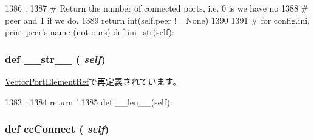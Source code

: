 \begin{DoxyCode}
1386                      :
1387         # Return the number of connected ports, i.e. 0 is we have no
1388         # peer and 1 if we do.
1389         return int(self.peer != None)
1390 
1391     # for config.ini, print peer's name (not ours)
    def ini_str(self):
\end{DoxyCode}
\hypertarget{classm5_1_1params_1_1PortRef_aa7a4b9bc0941308e362738503137460e}{
\subsubsection[{\_\-\_\-str\_\-\_\-}]{\setlength{\rightskip}{0pt plus 5cm}def \_\-\_\-str\_\-\_\- ( {\em self})}}
\label{classm5_1_1params_1_1PortRef_aa7a4b9bc0941308e362738503137460e}


\hyperlink{classm5_1_1params_1_1VectorPortElementRef_aa7a4b9bc0941308e362738503137460e}{VectorPortElementRef}で再定義されています。


\begin{DoxyCode}
1383                      :
1384         return '%
1385 
    def __len__(self):
\end{DoxyCode}
\hypertarget{classm5_1_1params_1_1PortRef_addaf6e2a0c3ee33ece43bba237efcd7d}{
\subsubsection[{ccConnect}]{\setlength{\rightskip}{0pt plus 5cm}def ccConnect ( {\em self})}}
\label{classm5_1_1params_1_1PortRef_addaf6e2a0c3ee33ece43bba237efcd7d}



